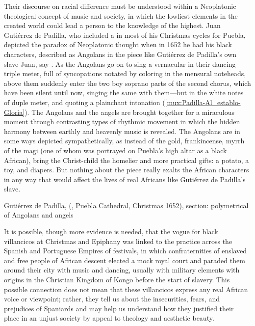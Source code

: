 Their discourse on racial difference must be understood within a Neoplatonic
theological concept of music and society, in which the lowliest elements in the
created world could lead a person to the knowledge of the highest.
Juan Gutiérrez de Padilla, who included a  in most of
his Christmas cycles for Puebla, depicted the paradox of Neoplatonic thought
when in 1652 he had his black characters, described as Angolans in the piece
like Gutiérrez de Padilla's own slave Juan, say .
As the Angolans go on to sing a vernacular  in their
dancing triple meter, full of syncopations notated by coloring in the mensural
noteheads, above them suddenly enter the two boy soprano parts of the second
chorus, which have been silent until now, singing the same  with
them---but in the white notes of duple meter, and quoting a plainchant
intonation (\cref{mux:Padilla-Al_establo-Gloria}).
The Angolans and the angels are brought together for a miraculous moment
through contrasting types of rhythmic movement in which the hidden harmony
between earthly and heavenly music is revealed.
The Angolans are in some ways depicted sympathetically, as instead
of the gold, frankincense, myrrh of the magi (one of whom was portrayed on
Puebla's high altar as a black African), bring the Christ-child the homelier
and more practical gifts: a potato, a toy, and diapers.
But nothing about the piece really exalts the African characters in any way
that would affect the lives of real Africans like Gutiérrez de Padilla's slave.

{Gutiérrez de Padilla,  
(, Puebla Cathedral, Christmas 1652), 
section: polymetrical  of Angolans and angels}

It is possible, though more evidence is needed, that the vogue for black
villancicos at Christmas and Epiphany was linked to the practice across the
Spanish and Portuguese Empires of  festivals, in which
confraternities of enslaved and free people of African descent elected a mock
royal court and paraded them around their city with music and dancing, usually
with military elements with origins in the Christian Kingdom of Kongo before
the start of slavery.%
    \citXXX[sources]
This possible connection does not mean that these villancicos express any real
African voice or viewpoint; rather, they tell us about the insecurities, fears,
and prejudices of Spaniards and may help us understand how they justified their
place in an unjust society by appeal to theology and aesthetic beauty.

